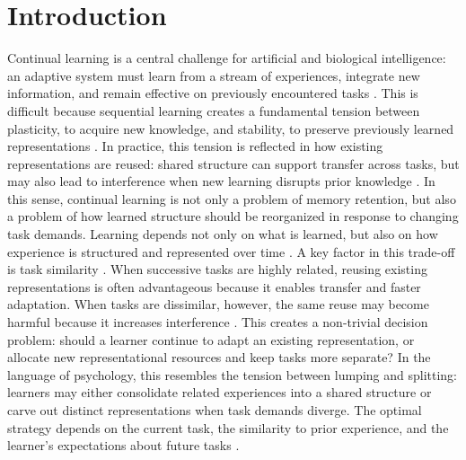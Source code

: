 \documentclass[letterpaper]{article}
\begin{document}
\section{Introduction}

        
        Continual learning is a central challenge for artificial and biological intelligence: an adaptive system must learn from a stream of experiences, integrate new information, and remain effective on previously encountered tasks \cite{ramasesh2020anatomy}. This is difficult because sequential learning creates a fundamental tension between plasticity, to acquire new knowledge, and stability, to preserve previously learned representations \cite{holton2025humans}. In practice, this tension is reflected in how existing representations are reused: shared structure can support transfer across tasks, but may also lead to interference when new learning disrupts prior knowledge \cite{lee2021continual, liu2023connectivity, mathis2025leveraging}. In this sense, continual learning is not only a problem of memory retention, but also a problem of how learned structure should be reorganized in response to changing task demands. Learning depends not only on what is learned, but also on how experience is structured and represented over time \cite{menghi2025impact}. A key factor in this trade-off is task similarity \cite{menghi2025effects}. When successive tasks are highly related, reusing existing representations is often advantageous because it enables transfer and faster adaptation. When tasks are dissimilar, however, the same reuse may become harmful because it increases interference \cite{hiratani2024disentangling}. This creates a non-trivial decision problem: should a learner continue to adapt an existing representation, or allocate new representational resources and keep tasks more separate? In the language of psychology, this resembles the tension between lumping and splitting: learners may either consolidate related experiences into a shared structure or carve out distinct representations when task demands diverge. The optimal strategy depends on the current task, the similarity to prior experience, and the learner's expectations about future tasks \cite{holton2025humans}.
        
\end{document}
